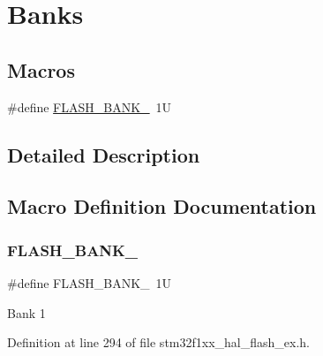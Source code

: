 \hypertarget{group___f_l_a_s_h_ex___banks}{}\section{Banks}
\label{group___f_l_a_s_h_ex___banks}
\subsection*{Macros}
\begin{DoxyCompactItemize}
\item 
\#define \hyperlink{group___f_l_a_s_h_ex___banks_ga8ac3f24496e5de6a2f6bd3ff77f0ca53}{F\+L\+A\+S\+H\+\_\+\+B\+A\+N\+K\+\_}~1U
\end{DoxyCompactItemize}


\subsection{Detailed Description}


\subsection{Macro Definition Documentation}
\mbox{\label{group___f_l_a_s_h_ex___banks_ga8ac3f24496e5de6a2f6bd3ff77f0ca53}} 
\subsubsection{\texorpdfstring{F\+L\+A\+S\+H\+\_\+\+B\+A\+N\+K\+\_}{FLASH\_BANK\_1}}
{\footnotesize\ttfamily \#define F\+L\+A\+S\+H\+\_\+\+B\+A\+N\+K\+\_~1U}

Bank 1 

Definition at line 294 of file stm32f1xx\+\_\+hal\+\_\+flash\+\_\+ex.\+h.

